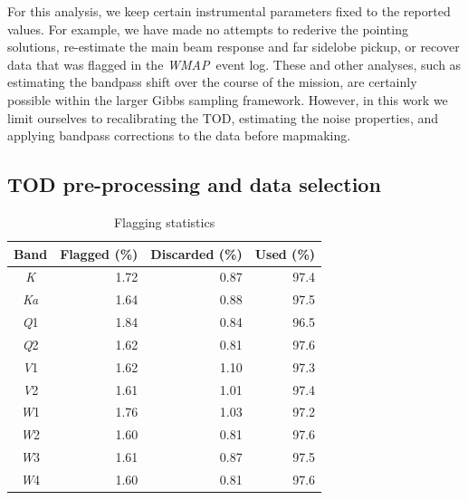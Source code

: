 \documentclass[twocolumn]{../../common/aa}
\def\WMAP{\emph{WMAP}}
\newcommand{\K}[0]{\textit K}
\newcommand{\Ka}[0]{\textit{Ka}}
\newcommand{\Q}[0]{\textit Q}
\newcommand{\V}[0]{\textit V}
\newcommand{\W}[0]{\textit W}
\begin{document}
For this analysis, we keep certain instrumental parameters fixed to the reported values. For example, we have made no attempts to rederive the pointing solutions, re-estimate the main beam response and far sidelobe pickup, or recover data that was flagged in the \WMAP\ event log. These and other analyses, such as estimating the bandpass shift over the course of the mission, are certainly possible within the larger Gibbs sampling framework. However, in this work we limit ourselves to recalibrating the TOD, estimating the noise properties, and applying bandpass corrections to the data before mapmaking.

\subsection{TOD pre-processing and data selection}
\label{sec:preprocessing}

\begin{table}
\caption{Flagging statistics}              %
\label{table:flagged_data}      %
\centering                                      %
\begin{tabular}{c r r r}          %
\hline\hline                        %
	Band & Flagged (\%) & Discarded (\%) & Used (\%) \\    %
\hline                                   %
	\K  &  1.72 & 0.87 & 97.4\\
	\Ka &  1.64 & 0.88 & 97.5\\      %
	\Q1 &  1.84 & 0.84 & 96.5\\
	\Q2 &  1.62 & 0.81 & 97.6\\
	\V1 &  1.62 & 1.10 & 97.3\\
	\V2 &  1.61 & 1.01 & 97.4\\
	\W1 &  1.76 & 1.03 & 97.2\\
	\W2 &  1.60 & 0.81 & 97.6\\
	\W3 &  1.61 & 0.87 & 97.5\\
	\W4 &  1.60 & 0.81 & 97.6\\
\hline                                             %
\end{tabular}
\end{table}


\end{document}
